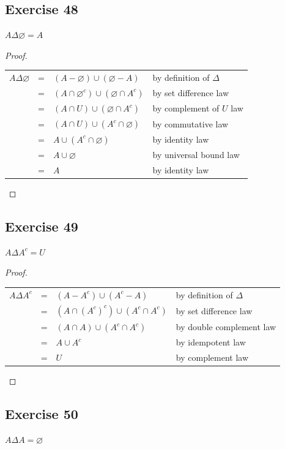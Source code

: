 \documentclass[14pt]{extarticle}
\newcommand{\es}{\varnothing}
\newcommand{\cy}{\color{cyan}}
\begin{document}
\subsection{Exercise 48}
\(A \Delta \es = A\)

\begin{proof}
\begin{center}
\begin{tabular}{rcll}
\(A \Delta \es\) & = & \((A - \es) \cup (\es - A)\) & {\cy by definition of $\Delta$} \\
&= & \((A \cap \es^c) \cup (\es \cap A^c)\) & {\cy by set difference law} \\
&= & \((A \cap U) \cup (\es \cap A^c)\) & {\cy by complement of $U$ law} \\
&= & \((A \cap U) \cup (A^c \cap \es)\) & {\cy by commutative law} \\
&= & \(A \cup (A^c \cap \es)\) & {\cy by identity law} \\
&= & \(A \cup \es\) & {\cy by universal bound law} \\
&= & \(A\) & {\cy by identity law}
\end{tabular}
\end{center}
\end{proof}

\subsection{Exercise 49}
\(A \Delta A^c = U\)

\begin{proof}
\begin{center}
\begin{tabular}{rcll}
\(A \Delta A^c\) & = & \((A - A^c) \cup (A^c - A)\) & {\cy by definition of $\Delta$} \\
& = & \((A \cap (A^c)^c) \cup (A^c \cap A^c)\) & {\cy by set difference law} \\
& = & \((A \cap A) \cup (A^c \cap A^c)\) & {\cy by double complement law} \\
& = & \(A \cup A^c\) & {\cy by idempotent law} \\
& = & \(U\) & {\cy by complement law}
\end{tabular}
\end{center}
\end{proof}

\subsection{Exercise 50}
\(A \Delta A = \es\)
\end{document}
